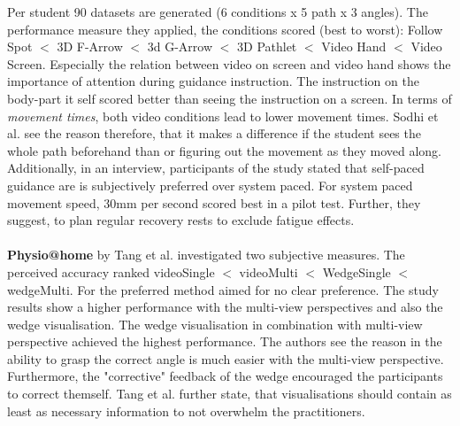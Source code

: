 Per student 90 datasets are generated (6 conditions x 5 path x 3 angles). The performance measure they applied, the conditions scored (best to worst): Follow Spot $<$ 3D F-Arrow $<$ 3d G-Arrow $<$ 3D Pathlet $<$ Video Hand $<$ Video Screen. Especially the relation between video on screen and video hand shows the importance of attention during guidance instruction. The instruction on the body-part it self scored better than seeing the instruction on a screen. In terms of \textit{movement times}, both video conditions lead to lower movement times. Sodhi et al. see the reason therefore, that it makes a difference if the student sees the whole path beforehand than or figuring out the movement as they moved along. Additionally, in an interview, participants of the study stated that self-paced guidance are is subjectively preferred over system paced. For system paced movement speed, 30mm per second scored best in a pilot test. Further, they suggest, to plan regular recovery rests to exclude fatigue effects.\\ \\
\textbf{Physio@home} by Tang et al. \cite{Tang2015} investigated two subjective measures. The perceived accuracy ranked videoSingle $<$ videoMulti $<$ WedgeSingle $<$ wedgeMulti. For the preferred method aimed for no clear preference. The study results show a higher performance with the multi-view perspectives and also the wedge visualisation. The wedge visualisation in combination with multi-view perspective achieved the highest performance. The authors see the reason in the ability to grasp the correct angle is much easier with the multi-view perspective. Furthermore, the "corrective" feedback of the wedge encouraged the participants to correct themself. Tang et al. further state, that visualisations should contain as least as necessary information to not overwhelm the practitioners. 
